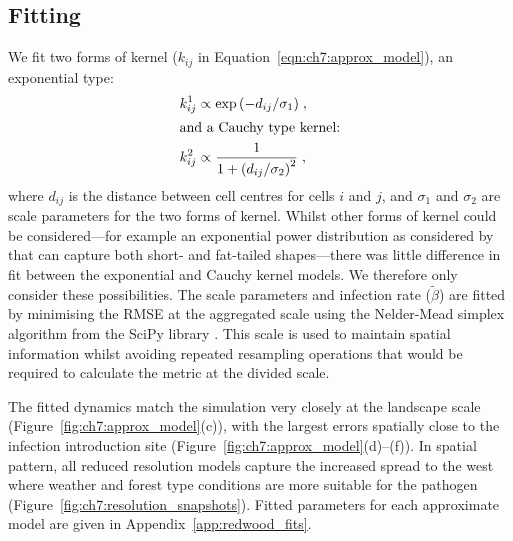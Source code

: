 \subsection{Fitting}

We fit two forms of kernel ($k_{ij}$ in Equation~\ref{eqn:ch7:approx_model}), an exponential type:
\begin{align}
    k_{ij}^1 &\propto \exp{\left(-d_{ij}/\sigma_1\right)}\;, \\
\intertext{and a Cauchy type kernel:}
    k_{ij}^2 &\propto \frac{1}{1+\left(d_{ij}/\sigma_2\right)^2}\;,
\end{align}
where $d_{ij}$ is the distance between cell centres for cells $i$ and $j$, and $\sigma_1$ and $\sigma_2$ are scale parameters for the two forms of kernel. Whilst other forms of kernel could be considered---for example an exponential power distribution as considered by \citep{skelsey_pest_2013} that can capture both short- and fat-tailed shapes---there was little difference in fit between the exponential and Cauchy kernel models. We therefore only consider these possibilities. The scale parameters and infection rate ($\tilde{\beta}$) are fitted by minimising the RMSE at the aggregated scale using the Nelder-Mead simplex algorithm \citep{gao_implementing_2012} from the SciPy library \citep{scipy}. This scale is used to maintain spatial information whilst avoiding repeated resampling operations that would be required to calculate the metric at the divided scale.

The fitted dynamics match the simulation very closely at the landscape scale (Figure~\ref{fig:ch7:approx_model}(c)), with the largest errors spatially close to the infection introduction site (Figure~\ref{fig:ch7:approx_model}(d)--(f)). In spatial pattern, all reduced resolution models capture the increased spread to the west where weather and forest type conditions are more suitable for the pathogen (Figure~\ref{fig:ch7:resolution_snapshots}). Fitted parameters for each approximate model are given in Appendix~\ref{app:redwood_fits}.


